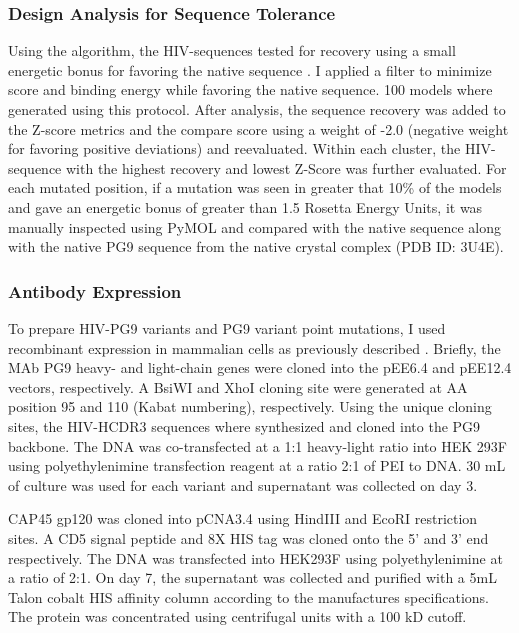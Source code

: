 \subsubsection{Design Analysis for Sequence Tolerance}
Using the \rosettadesign algorithm, the HIV-\naive sequences tested for recovery using a small energetic bonus for favoring the native sequence \citep{Kuhlman:2000tc}. I applied a filter to minimize score and binding energy while favoring the native sequence. 100 models where generated using this protocol. After analysis, the sequence recovery was added to the Z-score metrics and the compare score using a weight of -2.0 (negative weight for favoring positive deviations) and reevaluated. Within each cluster, the HIV-\naive sequence with the highest recovery and lowest Z-Score was further evaluated. For each mutated position, if a mutation was seen in greater that 10\% of the models and gave an energetic bonus of greater than 1.5 Rosetta Energy Units, it was manually inspected using PyMOL and compared with the native sequence along with the native PG9 sequence from the native crystal complex (PDB ID: 3U4E).

\subsubsection{Antibody Expression}
To prepare HIV-\naive PG9 variants and PG9 variant point mutations, I used recombinant expression in mammalian cells as previously described \citep{Xu:2010da}. Briefly, the MAb PG9 heavy- and light-chain genes were cloned into the pEE6.4 and pEE12.4 vectors, respectively. A BsiWI and XhoI cloning site were generated at AA position 95 and 110 (Kabat numbering), respectively. Using the unique cloning sites, the HIV-\naive HCDR3 sequences where synthesized and cloned into the PG9 backbone. The DNA was co-transfected at a 1:1 heavy-light ratio into HEK 293F using polyethylenimine transfection reagent at a ratio 2:1 of PEI to DNA. 30 mL of culture was used for each variant and supernatant was collected on day 3.

CAP45 gp120 was cloned into pCNA3.4 using HindIII and EcoRI restriction sites. A CD5 signal peptide and 8X HIS tag was cloned onto the 5' and 3' end respectively. The DNA was transfected into HEK293F using polyethylenimine at a ratio of 2:1. On day 7, the supernatant was collected and purified with a 5mL Talon cobalt HIS affinity column according to the manufactures specifications. The protein was concentrated using centrifugal units with a 100 kD cutoff.

